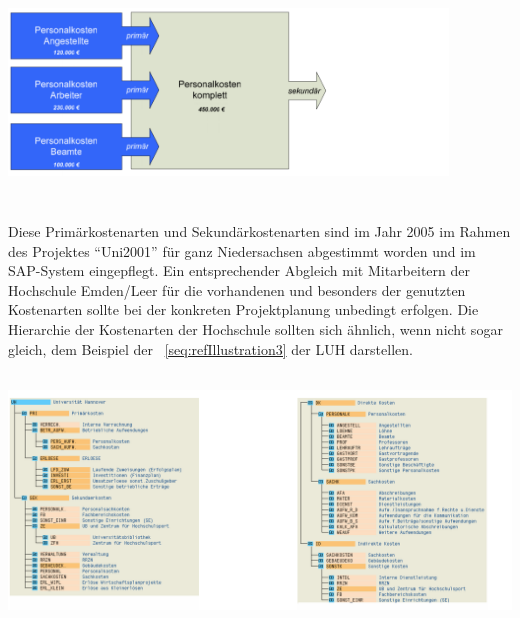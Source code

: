 \documentclass[a4paper]{article}
\makeatletter
\newcommand\captionof[1]{\def\@captype{#1}\caption}
\makeatother
\begin{document}
{\centering \includegraphics[width=11.67cm,height=5.884cm]{INMAusarbeitung02-img003.png}
\captionof{figure}[U\"{ }bergang von Prima\"{ }r{}- in Sekunda\"{ }rkostenarten (Handbuch Kostenartenrechnung
05)]{\"{U}bergang von Prim\"{a}r- in Sekund\"{a}rkostenarten\textcolor[rgb]{1.0,0.2,0.2}{ (Handbuch Kostenartenrechnung
05}\textcolor{red}{)}}
\label{seq:refIllustration2}
\par}
{\sffamily
Diese Primärkostenarten und Sekundärkostenarten sind im Jahr 2005 im Rahmen des Projektes “Uni2001” für ganz
Niedersachsen abgestimmt worden und im SAP-System eingepflegt. Ein entsprechender Abgleich mit Mitarbeitern der
Hochschule Emden/Leer für die vorhandenen und besonders der genutzten Kostenarten sollte bei der konkreten
Projektplanung unbedingt erfolgen. Die Hierarchie der Kostenarten der Hochschule sollten sich ähnlich, wenn nicht sogar
gleich, dem Beispiel der \figurename~\ref{seq:refIllustration3} der LUH darstellen.}

{\centering \includegraphics[width=15.385cm,height=6.706cm]{INMAusarbeitung02-img004.png}
\captionof{figure}[ \ Kostenartenhierarchie der Hochschulen Uni2001 (Handbuch Kostenartenrechnung 05)]{
\ Kostenartenhierarchie der Hochschulen Uni2001\textcolor[rgb]{1.0,0.2,0.2}{ (Handbuch Kostenartenrechnung
05}\textcolor{red}{)}}
\label{seq:refIllustration3}
\par}
\end{document}
